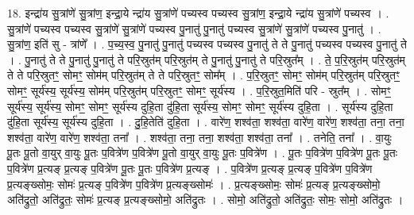 \documentclass[17pt]{extarticle}
\begin{document}
18. इन्द्रा॑य सु॒त्रांणे॑ सु॒त्रांण॒ इन्द्रा॒ये न्द्रा॑य सु॒त्रांणे॑ पच्यस्व पच्यस्व सु॒त्रांण॒ इन्द्रा॒ये न्द्रा॑य सु॒त्रांणे॑ पच्यस्व । . सु॒त्रांणे॑ पच्यस्व पच्यस्व सु॒त्रांणे॑ सु॒त्रांणे॑ पच्यस्व पु॒नातु॑ पु॒नातु॑ पच्यस्व सु॒त्रांणे॑ सु॒त्रांणे॑ पच्यस्व पु॒नातु॑ । . सु॒त्रांण॒ इति॑ सु - त्रांणे᳚ । . प॒च्य॒स्व॒ पु॒नातु॑ पु॒नातु॑ पच्यस्व पच्यस्व पु॒नातु॑ ते ते पु॒नातु॑ पच्यस्व पच्यस्व पु॒नातु॑ ते । . पु॒नातु॑ ते ते पु॒नातु॑ पु॒नातु॑ ते परि॒स्रुत॑म् परि॒स्रुत॑म् ते पु॒नातु॑ पु॒नातु॑ ते परि॒स्रुत᳚म् । . ते॒ प॒रि॒स्रुत॑म् परि॒स्रुत॑म् ते ते परि॒स्रुतꣳ॒॒ सोमꣳ॒॒ सोम॑म् परि॒स्रुत॑म् ते ते परि॒स्रुतꣳ॒॒ सोम᳚म् । . प॒रि॒स्रुतꣳ॒॒ सोमꣳ॒॒ सोम॑म् परि॒स्रुत॑म् परि॒स्रुतꣳ॒॒ सोमꣳ॒॒ सूर्य॑स्य॒ सूर्य॑स्य॒ सोम॑म् परि॒स्रुत॑म् परि॒स्रुतꣳ॒॒ सोमꣳ॒॒ सूर्य॑स्य । . प॒रि॒स्रुत॒मिति॑ परि - स्रुत᳚म् । . सोमꣳ॒॒ सूर्य॑स्य॒ सूर्य॑स्य॒ सोमꣳ॒॒ सोमꣳ॒॒ सूर्य॑स्य दुहि॒ता दु॑हि॒ता सूर्य॑स्य॒ सोमꣳ॒॒ सोमꣳ॒॒ सूर्य॑स्य दुहि॒ता । . सूर्य॑स्य दुहि॒ता दु॑हि॒ता सूर्य॑स्य॒ सूर्य॑स्य दुहि॒ता । . दु॒हि॒तेति॑ दुहि॒ता । . वारे॑ण॒ शश्व॑ता॒ शश्व॑ता॒ वारे॑ण॒ वारे॑ण॒ शश्व॑ता॒ तना॒ तना॒ शश्व॑ता॒ वारे॑ण॒ वारे॑ण॒ शश्व॑ता॒ तना᳚ । . शश्व॑ता॒ तना॒ तना॒ शश्व॑ता॒ शश्व॑ता॒ तना᳚ । . तनेति॒ तना᳚ । . वा॒युः पू॒तः पू॒तो वा॒युर् वा॒युः पू॒तः प॒वित्रे॑ण प॒वित्रे॑ण पू॒तो वा॒युर् वा॒युः पू॒तः प॒वित्रे॑ण । . पू॒तः प॒वित्रे॑ण प॒वित्रे॑ण पू॒तः पू॒तः प॒वित्रे॑ण प्र॒त्यङ् प्र॒त्यङ् प॒वित्रे॑ण पू॒तः पू॒तः प॒वित्रे॑ण प्र॒त्यङ् । . प॒वित्रे॑ण प्र॒त्यङ् प्र॒त्यङ् प॒वित्रे॑ण प॒वित्रे॑ण प्र॒त्यङ्ख्सोमः॒ सोमः॑ प्र॒त्यङ् प॒वित्रे॑ण प॒वित्रे॑ण 
प्र॒त्यङ्ख्सोमः॑ । . प्र॒त्यङ्ख्सोमः॒ सोमः॑ प्र॒त्यङ् प्र॒त्यङ्ख्सोमो॒ अति॑द्रुतो॒ अति॑द्रुतः॒ सोमः॑ प्र॒त्यङ् प्र॒त्यङ्ख्सोमो॒ अति॑द्रुतः । . सोमो॒ अति॑द्रुतो॒ अति॑द्रुतः॒ सोमः॒ सोमो॒ अति॑द्रुतः । \newline
\end{document}
